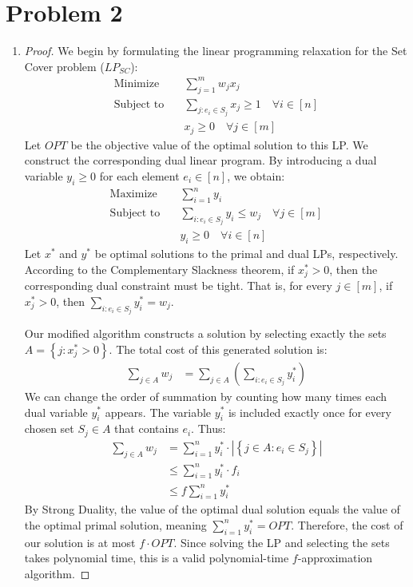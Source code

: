 \section*{Problem 2}
\begin{enumerate}[label=(\alph*), leftmargin=*, align=left]
    \item 
    \begin{proof}
        We begin by formulating the linear programming relaxation for the Set Cover problem ($LP_{SC}$):
        \begin{align*}
            \text{Minimize} \quad & \sum_{j=1}^{m} w_j x_j \\
            \text{Subject to} \quad & \sum_{j: e_i \in S_j} x_j \ge 1 \quad \forall i \in [n] \\
            & x_j \ge 0 \quad \forall j \in [m]
        \end{align*}
        Let $OPT$ be the objective value of the optimal solution to this LP. We construct the corresponding dual linear program. By introducing a dual variable $y_i \ge 0$ for each element $e_i \in [n]$, we obtain:
        \begin{align*}
            \text{Maximize} \quad & \sum_{i=1}^{n} y_i \\
            \text{Subject to} \quad & \sum_{i: e_i \in S_j} y_i \le w_j \quad \forall j \in [m] \\
            & y_i \ge 0 \quad \forall i \in [n]
        \end{align*}
        Let $x^*$ and $y^*$ be optimal solutions to the primal and dual LPs, respectively. According to the Complementary Slackness theorem, if $x^*_j > 0$, then the corresponding dual constraint must be tight. That is, for every $j \in [m]$, if $x^*_j > 0$, then $\sum_{i: e_i \in S_j} y^*_i = w_j$.

        Our modified algorithm constructs a solution by selecting exactly the sets $A = \left\{ j : x^*_j > 0 \right\}$. The total cost of this generated solution is:
        \begin{align*}
            \sum_{j \in A} w_j &= \sum_{j \in A} \left( \sum_{i: e_i \in S_j} y^*_i \right)
        \end{align*}
        We can change the order of summation by counting how many times each dual variable $y^*_i$ appears. The variable $y^*_i$ is included exactly once for every chosen set $S_j \in A$ that contains $e_i$. Thus:
        \begin{align*}
            \sum_{j \in A} w_j &= \sum_{i=1}^{n} y^*_i \cdot \left| \left\{ j \in A : e_i \in S_j \right\} \right| \\
            &\le \sum_{i=1}^{n} y^*_i \cdot f_i \tag{Where $f_i$ is the frequency of $e_i$ in the input} \\
            &\le f \sum_{i=1}^{n} y^*_i
        \end{align*}
        By Strong Duality, the value of the optimal dual solution equals the value of the optimal primal solution, meaning $\sum_{i=1}^{n} y^*_i = OPT$. Therefore, the cost of our solution is at most $f \cdot OPT$. Since solving the LP and selecting the sets takes polynomial time, this is a valid polynomial-time $f$-approximation algorithm.
    \end{proof}


\end{enumerate}
